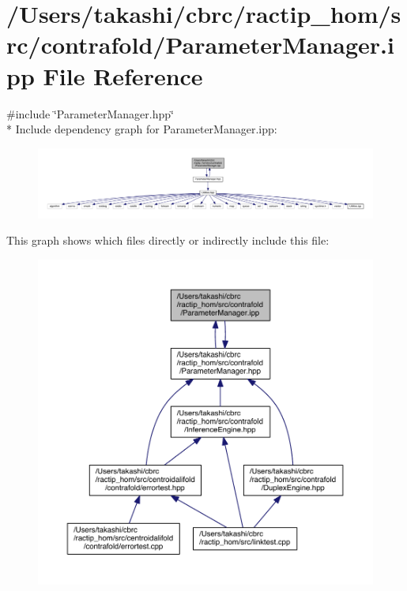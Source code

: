 \hypertarget{contrafold_2_parameter_manager_8ipp}{\section{/\+Users/takashi/cbrc/ractip\+\_\+hom/src/contrafold/\+Parameter\+Manager.ipp File Reference}
\label{contrafold_2_parameter_manager_8ipp}
}
{\ttfamily \#include \char`\"{}Parameter\+Manager.\+hpp\char`\"{}}\\*
Include dependency graph for Parameter\+Manager.\+ipp\+:
\nopagebreak
\begin{figure}[H]
\begin{center}
\leavevmode
\includegraphics[width=350pt]{contrafold_2_parameter_manager_8ipp__incl}
\end{center}
\end{figure}
This graph shows which files directly or indirectly include this file\+:
\nopagebreak
\begin{figure}[H]
\begin{center}
\leavevmode
\includegraphics[width=350pt]{contrafold_2_parameter_manager_8ipp__dep__incl}
\end{center}
\end{figure}
